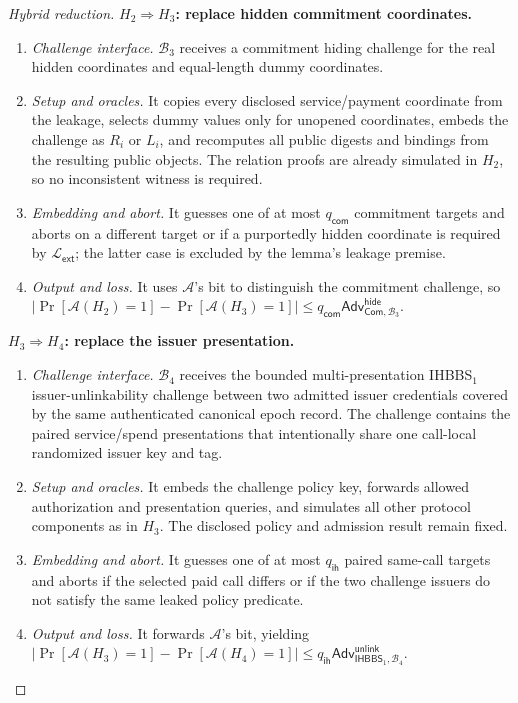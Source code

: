 \documentclass[letterpaper]{article}
\newcommand{\adv}{\mathcal{A}}
\newcommand{\commit}{\mathsf{Com}}
\newcommand{\Adv}{\mathsf{Adv}}
\begin{document}
\begin{proof}[Hybrid reduction]
\textbf{\(H_2\Rightarrow H_3\): replace hidden commitment coordinates.}
\begin{enumerate}
  \item \emph{Challenge interface.} \(\mathcal B_3\) receives a commitment
  hiding challenge for the real hidden coordinates and equal-length dummy
  coordinates.
  \item \emph{Setup and oracles.} It copies every disclosed service/payment
  coordinate from the leakage, selects dummy values only for unopened
  coordinates, embeds the challenge as \(R_i\) or \(L_i\), and recomputes all
  public digests and bindings from the resulting public objects. The relation
  proofs are already simulated in \(H_2\), so no inconsistent witness is
  required.
  \item \emph{Embedding and abort.} It guesses one of at most
  \(q_{\mathsf{com}}\) commitment targets and aborts on a different target or
  if a purportedly hidden coordinate is required by
  \(\mathcal L_{\mathsf{ext}}\); the latter case is excluded by the lemma's
  leakage premise.
  \item \emph{Output and loss.} It uses \(\adv\)'s bit to distinguish the
  commitment challenge, so
  \(\lvert\Pr[\adv(H_2)=1]-\Pr[\adv(H_3)=1]\rvert
  \le q_{\mathsf{com}}\Adv^{\mathsf{hide}}_{\commit,\mathcal B_3}\).
\end{enumerate}

\textbf{\(H_3\Rightarrow H_4\): replace the issuer presentation.}
\begin{enumerate}
  \item \emph{Challenge interface.} \(\mathcal B_4\) receives the
  bounded multi-presentation IHBBS\(_1\) issuer-unlinkability challenge between
  two admitted issuer credentials covered by the same authenticated canonical
  epoch record. The challenge contains the paired service/spend presentations
  that intentionally share one call-local randomized issuer key and tag.
  \item \emph{Setup and oracles.} It embeds the challenge policy key, forwards
  allowed authorization and presentation queries, and simulates all other
  protocol components as in \(H_3\). The disclosed policy and admission result
  remain fixed.
  \item \emph{Embedding and abort.} It guesses one of at most
  \(q_{\mathsf{ih}}\) paired same-call targets and aborts if the selected
  paid call differs or if the two challenge issuers do not satisfy the same
  leaked policy predicate.
  \item \emph{Output and loss.} It forwards \(\adv\)'s bit, yielding
  \(\lvert\Pr[\adv(H_3)=1]-\Pr[\adv(H_4)=1]\rvert
  \le q_{\mathsf{ih}}\Adv^{\mathsf{unlink}}_{\mathsf{IHBBS}_1,\mathcal B_4}\).
\end{enumerate}


\end{proof}
\end{document}
